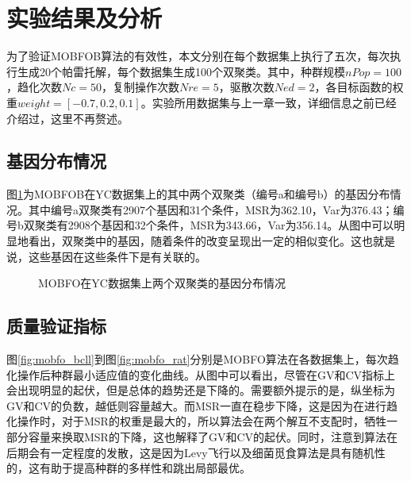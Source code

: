 \section{实验结果及分析}
为了验证MOBFOB算法的有效性，本文分别在每个数据集上执行了五次，每次执行生成20个帕雷托解，每个数据集生成100个双聚类。其中，种群规模$nPop=100$，趋化次数$Nc=50$，复制操作次数$Nre=5$，驱散次数$Ned=2$，各目标函数的权重$weight = [-0.7, 0.2, 0.1]$。实验所用数据集与上一章一致，详细信息之前已经介绍过，这里不再赘述。

    \subsection{基因分布情况}
    图\ref{fig:mobfo_bics}为MOBFOB在YC数据集上的其中两个双聚类（编号a和编号b）的基因分布情况。其中编号a双聚类有2907个基因和31个条件，MSR为362.10，Var为376.43；编号b双聚类有2908个基因和32个条件，MSR为343.66，Var为356.14。从图中可以明显地看出，双聚类中的基因，随着条件的改变呈现出一定的相似变化。这也就是说，这些基因在这些条件下是有关联的。
    \begin{figure}[htbp]
    \setlength{\subfigcapskip}{-1bp}
    \centering
    \begin{minipage}{.9\textwidth}
    \centering
    \subfigure{}\addtocounter{subfigure}{-2}
    \hspace{.1em}
    \subfigure{}\addtocounter{subfigure}{-2}
    \end{minipage}
    \vspace{0.2em}
    \caption{MOBFO在YC数据集上两个双聚类的基因分布情况}
    \label{fig:mobfo_bics}
    \end{figure}

    \subsection{质量验证指标}
    图\ref{fig:mobfo_bcll}到图\ref{fig:mobfo_rat}分别是MOBFO算法在各数据集上，每次趋化操作后种群最小适应值的变化曲线。从图中可以看出，尽管在GV和CV指标上会出现明显的起伏，但是总体的趋势还是下降的。需要额外提示的是，纵坐标为GV和CV的负数，越低则容量越大。而MSR一直在稳步下降，这是因为在进行趋化操作时，对于MSR的权重是最大的，所以算法会在两个解互不支配时，牺牲一部分容量来换取MSR的下降，这也解释了GV和CV的起伏。同时，注意到算法在后期会有一定程度的发散，这是因为Levy飞行以及细菌觅食算法是具有随机性的，这有助于提高种群的多样性和跳出局部最优。

